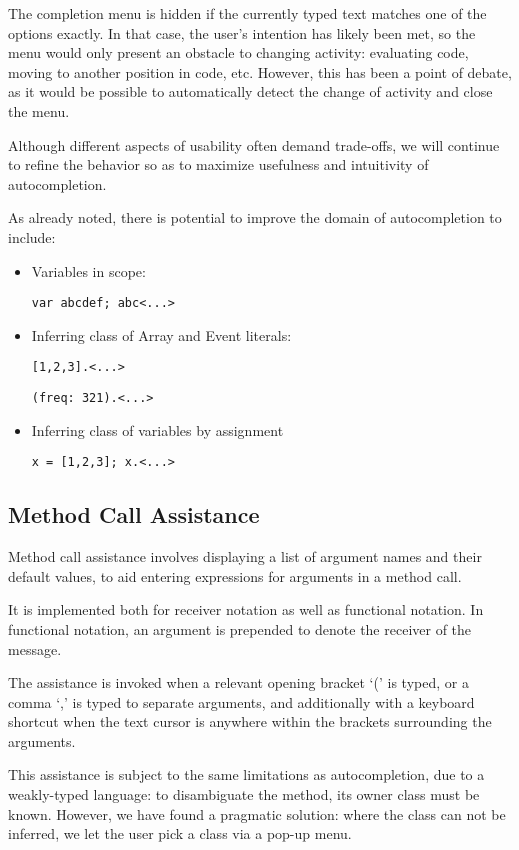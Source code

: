 \documentclass[11pt,a4paper]{article}
\begin{document}
The completion menu is hidden if the currently typed text matches one of the options exactly. In
that case, the user's intention has likely been met, so the menu would only present an obstacle to
changing activity: evaluating code, moving to another position in code, etc. However, this has been
a point of debate, as it would be possible to automatically detect the change of activity and close
the menu.

Although different aspects of usability often demand trade-offs, we will continue to refine the
behavior so as to maximize usefulness and intuitivity of autocompletion.

As already noted, there is potential to improve the domain of autocompletion to include:
\begin{itemize}
 \item Variables in scope:

 \verb|var abcdef; abc<...>|

 \item Inferring class of Array and Event literals:

 \verb|[1,2,3].<...>|

 \verb|(freq: 321).<...>|

 \item Inferring class of variables by assignment

 \verb|x = [1,2,3]; x.<...>|

\end{itemize}

\subsection{Method Call Assistance}

Method call assistance involves displaying a list of argument names and their default values, to aid
entering expressions for arguments in a method call.

It is implemented both for receiver notation as well as functional notation. In functional notation,
an argument is prepended to denote the receiver of the message.

The assistance is invoked when a relevant opening bracket `(' is typed, or a comma `,' is typed to
separate arguments, and additionally with a keyboard shortcut when the text cursor is anywhere
within the brackets surrounding the arguments.

This assistance is subject to the same limitations as autocompletion, due to a weakly-typed
language: to disambiguate the method, its owner class must be known. However, we have found a
pragmatic solution: where the class can not be inferred, we let the user pick a class via a pop-up
menu.
\end{document}
